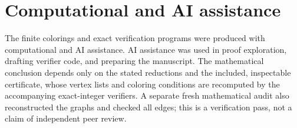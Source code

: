 \documentclass[11pt]{article}
\begin{document}
\section*{Computational and AI assistance}

The finite colorings and exact verification programs were produced with
computational and AI assistance.  AI assistance was used in proof
exploration, drafting verifier code, and preparing the manuscript.  The
mathematical conclusion depends only on the stated reductions and the
included, inspectable certificate, whose vertex lists and coloring conditions
are recomputed by the accompanying exact-integer verifiers.  A separate fresh
mathematical audit also reconstructed the graphs and checked all edges; this
is a verification pass, not a claim of independent peer review.



\end{document}
